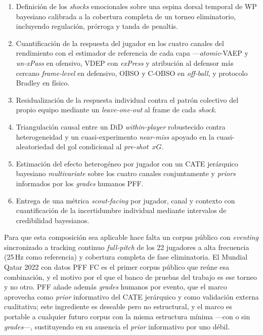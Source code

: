 \begin{enumerate}
  \item Definición de los \textit{shocks} emocionales sobre una espina
        dorsal temporal de WP bayesiano calibrada a la cobertura
        completa de un torneo eliminatorio, incluyendo regulación,
        prórroga y tanda de penaltis.
  \item Cuantificación de la respuesta del jugador en los cuatro canales
        del rendimiento con el estimador de referencia de cada capa
        ---\textit{atomic}-VAEP y \textit{un-xPass} en ofensivo, VDEP
        con \textit{exPress} y atribución al defensor más cercano
        \textit{frame-level} en defensivo, OBSO y
        C-OBSO en \textit{off-ball}, y protocolo Bradley en físico.
  \item Residualización de la respuesta individual contra el patrón
        colectivo del propio equipo mediante un \textit{leave-one-out}
        al frame de cada \textit{shock}.
  \item Triangulación causal entre un DiD \textit{within-player}
        robustecido contra heterogeneidad y un cuasi-experimento
        \textit{near-miss} apoyado en la cuasi-aleatoriedad del gol
        condicional al \textit{pre-shot}~$xG$.
  \item Estimación del efecto heterogéneo por jugador con un CATE
        jerárquico bayesiano \textit{multivariate} sobre los cuatro
        canales conjuntamente y \textit{priors} informados por los
        \textit{grades} humanos PFF.
  \item Entrega de una métrica \textit{scout-facing} por jugador, canal
        y contexto con cuantificación de la incertidumbre individual
        mediante intervalos de credibilidad bayesianos.
\end{enumerate}

Para que esta composición sea aplicable hace falta un corpus público
con \textit{eventing} sincronizado a tracking continuo \textit{full-pitch}
de los 22 jugadores a alta frecuencia (25\,Hz como referencia) y
cobertura completa de fase eliminatoria. El Mundial Qatar
2022 con datos PFF FC \parencite{PFFFC2024Release} es el primer corpus
público que reúne esa combinación, y el motivo por el que el banco de
pruebas del trabajo es ese torneo y no otro. PFF añade además
\textit{grades} humanos por evento, que el marco aprovecha como
\textit{prior} informativo del CATE jerárquico y como validación
externa cualitativa; este ingrediente es deseable pero no estructural,
y el marco es portable a cualquier futuro corpus con la misma
estructura mínima ---con o sin \textit{grades}---, sustituyendo en su
ausencia el \textit{prior} informativo por uno débil.
